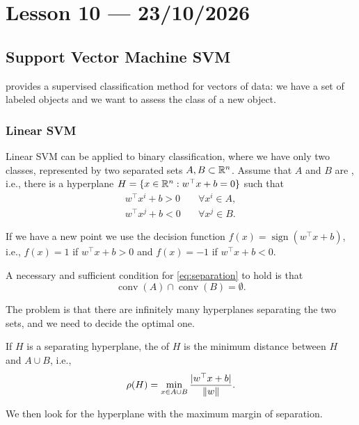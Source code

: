 \section{Lesson 10 --- 23/10/2026}

\subsection{Support Vector Machine SVM}

 provides a supervised classification method for vectors of data: we have a set of labeled objects and we want to assess the class of a new object.

\subsubsection{Linear SVM}

Linear SVM can be applied to binary classification, where we have only two classes, represented by two separated sets $A, B \subset \mathbb{R}^n$. Assume that $A$ and $B$ are , i.e., there is a hyperplane
$H = \{x \in \mathbb{R}^n : w^\top x + b = 0\}$ such that
\begin{equation}
    \begin{aligned}
        w^\top x^i + b > 0 \quad & \forall x^i \in A, \\
        w^\top x^j + b < 0 \quad & \forall x^j \in B.
    \end{aligned}
    \label{eq:separation}
\end{equation}

If we have a new point we use the decision function $f(x) = \operatorname{sign}(w^\top x + b)$, i.e., $f(x) = 1$ if $w^\top x + b > 0$ and $f(x) = -1$ if $w^\top x + b < 0$.

A necessary and sufficient condition for \cref{eq:separation} to hold is that
\[
    \operatorname{conv}(A) \cap \operatorname{conv}(B) = \emptyset.
\]

The problem is that there are infinitely many hyperplanes separating the two sets, and we need to decide the optimal one.

\begin{definition}
    If $H$ is a separating hyperplane, the  of $H$ is the minimum distance between $H$ and $A \cup B$, i.e.,
    \[
        \rho(H) = \min_{x \in A \cup B} \frac{|w^\top x + b|}{\left\lVert w \right\rVert}.
    \]
\end{definition}

We then look for the hyperplane with the maximum margin of separation.

